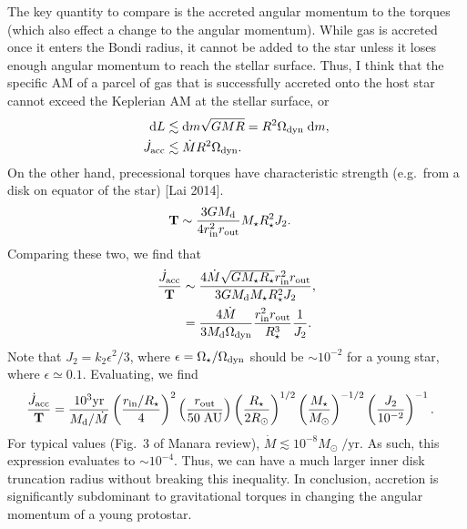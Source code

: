 \documentclass[12pt]{article}
\newcommand*{\bm}[1]{\boldsymbol{\mathbf{#1}}}
\newcommand*{\p}[1]{\left(#1\right)}
\begin{document}
The key quantity to compare is the accreted angular momentum to the torques
(which also effect a change to the angular momentum).
While gas is accreted once it enters the Bondi radius, it cannot be added to the
star unless it loses enough angular momentum to reach the stellar surface.
Thus, I think that the specific AM of a parcel of gas that is successfully
accreted onto the host star cannot exceed the Keplerian AM at the stellar
surface, or
\begin{align}
    \mathrm{d}L
        &\lesssim \mathrm{d}m \sqrt{GMR} = R^2 \Omega_{\rm dyn} \;\mathrm{d}m,\\
    \dot{J}_{\rm acc}
        &\lesssim \dot{M} R^2\Omega_{\rm dyn}.
\end{align}
On the other hand, precessional torques have characteristic strength (e.g.\ from
a disk on equator of the star) [Lai 2014].
\begin{align}
    \bm{T}
        &\sim \frac{3GM_{\rm d}}{4r_{\rm in}^2r_{\rm out}}M_\star R_\star^2J_2.
\end{align}
Comparing these two, we find that
\begin{align}
    \frac{\dot{J}_{\rm acc}}{\bm{T}}
        &\sim \frac{4\dot{M}\sqrt{GM_\star R_\star}r_{\rm in}^2r_{\rm out}}{
            3GM_{\rm d}M_\star R_\star^2 J_2},\\
        &=
            \frac{4\dot{M}}{3M_{\rm d}\Omega_{\rm dyn}}
            \frac{r_{\rm in}^2r_{\rm out}}{R_\star^3}
            \frac{1}{J_2}.
\end{align}
Note that $J_2 = k_2 \epsilon^2 / 3$, where $\epsilon = \Omega_\star /
\Omega_{\rm dyn}$ should be $\sim 10^{-2}$ for a young star, where $\epsilon
\simeq 0.1$. Evaluating, we find
\begin{align}
    \frac{\dot{J}_{\rm acc}}{\bm{T}}
        &= \frac{10^3\mathrm{yr}}{M_{\rm d} / \dot{M}}
            \p{\frac{r_{\rm in} / R_\star}{4}}^2
            \p{\frac{r_{\rm out}}{50\;\mathrm{AU}}}
            \p{\frac{R_\star}{2R_{\odot}}}^{1/2}
            \p{\frac{M_\star}{M_{\odot}}}^{-1/2}
            \p{\frac{J_2}{10^{-2}}}^{-1}.
\end{align}
For typical values (Fig.~3 of Manara review), $\dot{M} \lesssim
10^{-8}M_{\odot}\;\mathrm{/yr}$.
As such, this expression evaluates to $\sim 10^{-4}$.
Thus, we can have a much larger inner disk truncation radius without breaking
this inequality.
In conclusion, accretion is significantly subdominant to gravitational torques
in changing the angular momentum of a young protostar.
\end{document}
